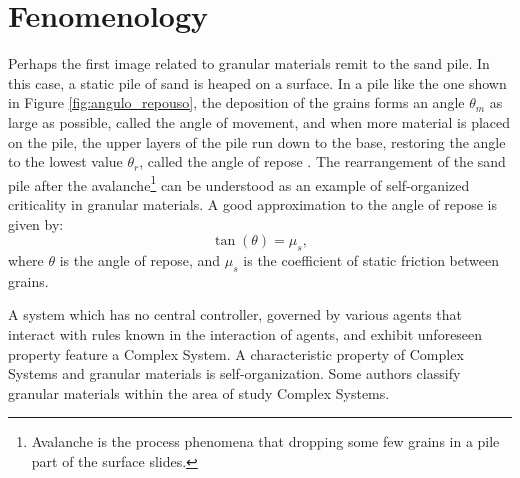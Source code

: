 \section{Fenomenology}
\label{subchap:Fenomenologia}
    Perhaps the first image related to granular materials remit to the sand pile. In this case, a static pile of sand is heaped on a surface. In a pile like the one shown in Figure \ref{fig:angulo_repouso}, the deposition of the grains forms an angle $\theta _m$ as large as possible, called the angle of movement, and when more material is placed on the pile, the upper layers of the pile run down to the base, restoring the angle to the lowest value $\theta _r$, called the angle of repose \cite{Sands_Powders_and_Grains, Granular_Physics}. The rearrangement of the sand pile after the avalanche\footnote{Avalanche is the process phenomena that dropping some few grains in a pile part of the surface slides.} can be understood as an example of self-organized criticality in granular materials. A good approximation to the angle of repose is given by:
    \begin{equation}
        \label{equ:atrito}
        \tan(\theta) = \mu _s ,
    \end{equation}
where $\theta$ is the angle of repose, and $\mu _s$ is the coefficient of static friction between grains.

    A system which has no central controller, governed by various agents that interact with rules known in the interaction of agents, and exhibit unforeseen property feature a Complex System. A characteristic property of Complex Systems and granular materials is self-organization. Some authors \cite{Avalanche_Dynamics_in_a_Pile_of_Rice, Avalanche_Prediction_in_a_Self-Organized_Pile_of_Beads, Mixing_and_Segregation_of_Granular_Materials, Measuring_the_flowing_properties_of_powders_and_grains, Revisiting_localized_deformation_in_sand_with_complex_systems, Granular_matter_and_networks, Patterns_and_collective_behavior_in_granular_media, Florent-Tese} classify granular materials within the area of study Complex Systems.

